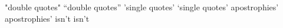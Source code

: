  "double quotes" 
 ``double quotes''
 'single quotes'
 `single quotes'
 apostrophies'
 apostrophies'
 isn't
 isn't
